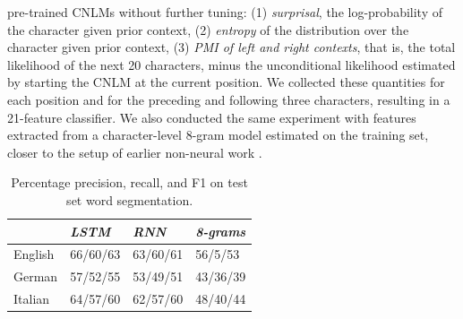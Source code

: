 pre-trained CNLMs without further tuning: (1) \emph{surprisal}, the
log-probability of the character given prior context, (2)
\emph{entropy} of the distribution over the character given prior
context, (3) \emph{PMI of left and right contexts}, that is, the total
 likelihood of the next 20 characters, minus the unconditional
 likelihood estimated by starting the CNLM at the current position. %
 We collected these quantities for each position and for the preceding
 and following three characters, resulting in a 21-feature classifier. %
We also conducted the same experiment with features extracted from a
character-level 8-gram model estimated on the training set, closer to
the setup of earlier non-neural work
\cite{saffran-word-1996, feng-accessor-2004}.


\begin{table}[t]
	\small
  \begin{center}
    \begin{tabular}{l|l|l|l}
      \multicolumn{1}{c|}{}&\emph{LSTM}&\emph{RNN}&\emph{8-grams}\\
      \hline
      English & 66/60/63 &   63/60/61 & 56/5/53    \\ %
      German &  57/52/55 &  53/49/51 & 43/36/39   \\ %
      Italian &  64/57/60 & 62/57/60  & 48/40/44    \\ %
    \end{tabular}
  \end{center}
  \caption{\label{tab:segmentation-results} Percentage precision, recall, and F1 on test set word segmentation.}
\end{table}


